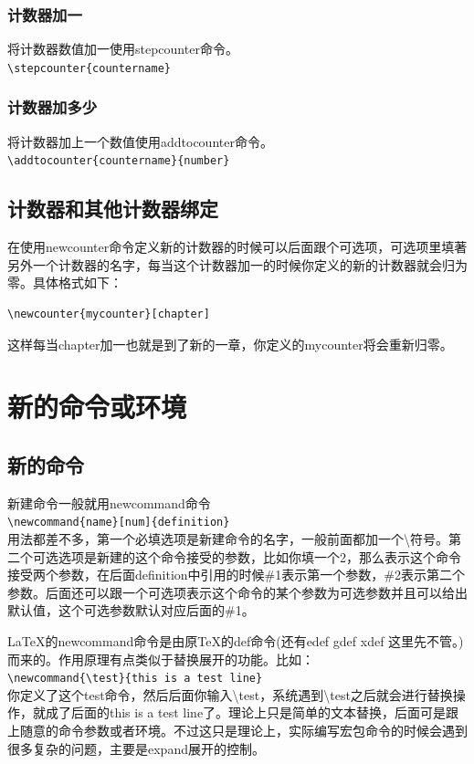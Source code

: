 \documentclass[12pt,oneside]{book}
\begin{document}
\begin{common-format}
\subsubsection{计数器加一}
将计数器数值加一使用stepcounter命令。\\
\verb+\stepcounter{countername}+

\subsubsection{计数器加多少}
将计数器加上一个数值使用addtocounter命令。\\
\verb+\addtocounter{countername}{number}+

\subsection{计数器和其他计数器绑定}
在使用newcounter命令定义新的计数器的时候可以后面跟个可选项，可选项里填著另外一个计数器的名字，每当这个计数器加一的时候你定义的新的计数器就会归为零。具体格式如下：
\begin{Verbatim}
\newcounter{mycounter}[chapter]
\end{Verbatim}
这样每当chapter加一也就是到了新的一章，你定义的mycounter将会重新归零。





\section{新的命令或环境}
\subsection{新的命令}
新建命令一般就用newcommand命令\\
\verb+\newcommand{name}[num]{definition}+\\
用法都差不多，第一个必填选项是新建命令的名字，一般前面都加一个\textbackslash 符号。第二个可选选项是新建的这个命令接受的参数，比如你填一个2，那么表示这个命令接受两个参数，在后面definition中引用的时候\#{}1表示第一个参数，\#{}2表示第二个参数。后面还可以跟一个可选项表示这个命令的某个参数为可选参数并且可以给出默认值，这个可选参数默认对应后面的\#{}1。

\LaTeX 的newcommand命令是由原\TeX 的def命令(还有edef gdef xdef 这里先不管。)而来的。作用原理有点类似于替换展开的功能。比如：\\
\verb+\newcommand{\test}{this is a test line}+\\
你定义了这个test命令，然后后面你输入\textbackslash test，系统遇到\textbackslash test之后就会进行替换操作，就成了后面的this is a test line了。理论上只是简单的文本替换，后面可是跟上随意的命令参数或者环境。不过这只是理论上，实际编写宏包命令的时候会遇到很多复杂的问题，主要是expand展开的控制。


\end{common-format}
\end{document}
